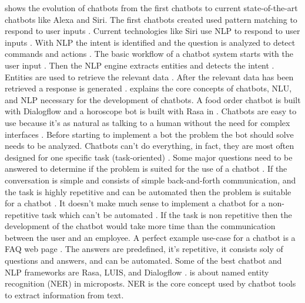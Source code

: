 \citet{deshpande2017survey} shows the evolution of chatbots from the first chatbots to 
current state-of-the-art chatbots like Alexa and Siri.
The first chatbots created used pattern matching to respond to user inputs \cite{deshpande2017survey}.
Current technologies like Siri use NLP to respond to user inputs \cite{deshpande2017survey}.
With NLP the intent is identified and the question is analyzed to detect commands and actions \cite{deshpande2017survey}.
The basic workflow of a chatbot system starts with the user input \cite{deshpande2017survey}. 
Then the NLP engine extracts entities and detects the intent \cite{deshpande2017survey}.
Entities are used to retrieve the relevant data \cite{deshpande2017survey}.
After the relevant data has been retrieved a response is generated \cite{deshpande2017survey}.
\citet{buiildChatbotsPython} explains the core concepts of chatbots, NLU, and NLP necessary for the development of chatbots.
A food order chatbot is built with Dialogflow and a horoscope bot is built with Rasa in \citet{buiildChatbotsPython}.
Chatbots are easy to use because it's as natural as talking to a human without the need for complex interfaces \cite{buiildChatbotsPython}.
Before starting to implement a bot the problem the bot should solve needs to be analyzed.
Chatbots can't do everything, in fact, they are most often designed for one specific task (task-oriented) \cite{buiildChatbotsPython}.
Some major questions need to be answered to determine if the problem is suited for the use of a chatbot \cite{buiildChatbotsPython}.
If the conversation is simple and consists of simple back-and-forth communication, and the task is 
highly repetitive and can be automated then the problem is suitable for a chatbot \cite{buiildChatbotsPython}.
It doesn't make much sense to implement a chatbot for a non-repetitive task which can't be automated \cite{buiildChatbotsPython}.
If the task is non repetitive then the development of the chatbot would take more 
time than the communication between the user and an employee.
A perfect example use-case for a chatbot is a FAQ web page \cite{buiildChatbotsPython}.
The answers are predefined, it's repetitive, it consists soly of questions and answers, and can be automated.
Some of the best chatbot and NLP frameworks are Rasa, LUIS, and Dialogflow \cite{buiildChatbotsPython}.
\citet{geyer2016named} is about named entity recognition (NER) in microposts.
NER is the core concept used by chatbot tools to extract information from text.
